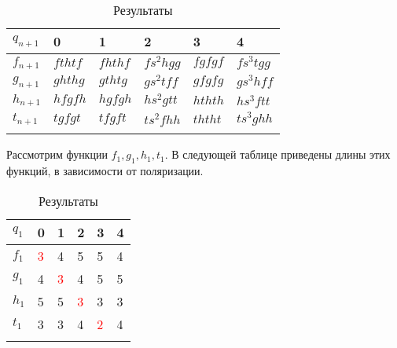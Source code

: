 \documentclass[a4paper, 12pt]{article}
\begin{document}
\begin{center}
\begin{longtable}{| l | l | l | l | l | l |}

\hline $q_{n+1}$ & 0 & 1 & 2 & 3 & 4 \\
\hline

$f_{n+1}$ & $f t h t f$ & $f h t h f$ & $f s^2 h g g$ & $f g f g f$ & $f s^3 t g g$
\\ \hline

$g_{n+1}$ & $g h t h g$ & $g t h t g$ & $g s^2 t f f$ & $g f g f g$ & $g s^3 h f f$
\\ \hline

$h_{n+1}$ & $h f g f h$ & $h g f g h$ & $h s^2 g t t$ & $h t h t h$ & $h s^3 f t t$
\\ \hline

$t_{n+1}$ & $t g f g t$ & $t f g f t$ & $t s^2 f h h$ & $t h t h t$ & $t s^3 g h h$
\\ \hline

\caption{Результаты}
\label{functab2}
\end{longtable}
\end{center}

Рассмотрим функции $f_1, g_1, h_1, t_1$. В следующей таблице приведены длины этих функций, в зависимости от поляризации.
\begin{center}
\begin{longtable}{| l | l | l | l | l | l |}

\hline $q_1$ & 0 & 1 & 2 & 3 & 4 \\
\hline

$f_1$ & \textcolor{red}{3} & 4 & 5 & 5 & 4
\\ \hline

$g_1$ & 4 & \textcolor{red}{3} & 4 & 5 & 5
\\ \hline

$h_1$ & 5 & 5 & \textcolor{red}{3} & 3 & 3
\\ \hline

$t_1$ & 3 & 3 & 4 & \textcolor{red}{2} & 4
\\ \hline

\caption{Результаты}
\label{functab2}
\end{longtable}
\end{center}

\newpage
\tableofcontents

\makeatletter
\renewcommand*{\@biblabel}[1]{\hfill#1.}
\makeatother

\newpage
\end{document}
